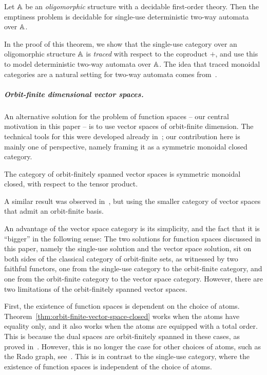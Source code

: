\documentclass[a4paper,UKenglish,cleveref, autoref, numberwithinsect, thm-restate]{lipics-v2021}
\begin{document}
\begin{theorem}\label{thm:two-way-automata}
    Let $\mathbb A$ be an \emph{oligomorphic} structure with a decidable first-order theory. Then the emptiness problem is decidable for single-use deterministic two-way automata over $\mathbb A$.
\end{theorem}

In the proof of this theorem, 
we show that the single-use category over an oligomorphic structure $\mathbb A$ is \emph{traced} with respect to the coproduct $+$, and use this to model deterministic two-way automata over $\mathbb A$. The idea that traced monoidal categories are a natural setting for two-way automata comes from~\cite{hines2003categorical}.

\subparagraph{Orbit-finite dimensional vector spaces.}

An alternative solution for the problem of function spaces -- our central motivation in this paper -- is to use vector spaces of orbit-finite dimension. The technical tools for this were developed already in~\cite{bojanczykKM21OrbitFiniteVector}; our contribution here is mainly one of perspective, namely framing it as a symmetric monoidal closed category.
\begin{theorem}\label{thm:orbit-finite-vector-space-closed} The category of orbit-finitely spanned vector spaces \cite[Section~VI]{bojanczykKM21OrbitFiniteVector} is symmetric monoidal closed, with respect to the tensor product.
\end{theorem}
\begin{remark}
    A similar result was observed in~\cite[Theorem 3.8]{przybylek2024note}, but using the smaller category of vector spaces that admit an orbit-finite basis.   
\end{remark}
An advantage of the vector space category is its simplicity, and the fact that it is ``bigger'' in the following sense: The two solutions for function spaces discussed in this paper, namely the single-use solution and the vector space solution, sit on both sides of the classical category of orbit-finite sets, as witnessed by two faithful functors, one from the single-use category to the orbit-finite category, and one from the orbit-finite category to the vector space category. 
However, there are two limitations of the orbit-finitely spanned vector spaces. 

First, the existence of function spaces is dependent on the choice of atoms. Theorem~\ref{thm:orbit-finite-vector-space-closed}  works when the atoms have equality only, and it also works when the atoms are equipped with a total order. This is because the dual spaces are orbit-finitely spanned in these cases, as proved in~\cite[Corollary VI.5]{bojanczykKM21OrbitFiniteVector}. However, this is no longer the case for other choices of  atoms, such as the Rado graph, see~\cite[Example 9]{bojanczykKM21OrbitFiniteVector}. This is in contrast to the single-use category, where the existence of function spaces is independent of the choice of atoms. 
\end{document}
